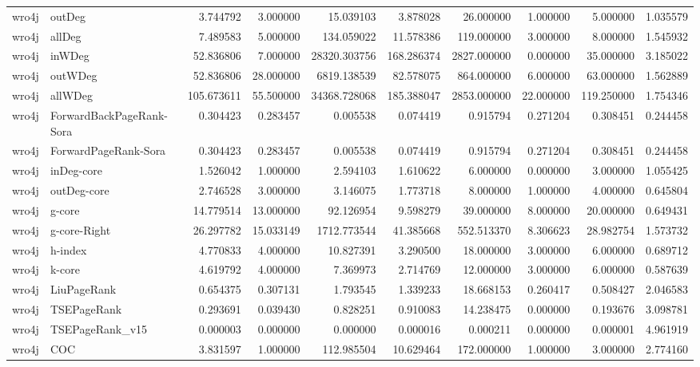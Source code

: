 \begin{tabular}{llrrrrrrrr}
wro4j & outDeg & 3.744792 & 3.000000 & 15.039103 & 3.878028 & 26.000000 & 1.000000 & 5.000000 & 1.035579 \\
wro4j & allDeg & 7.489583 & 5.000000 & 134.059022 & 11.578386 & 119.000000 & 3.000000 & 8.000000 & 1.545932 \\
wro4j & inWDeg & 52.836806 & 7.000000 & 28320.303756 & 168.286374 & 2827.000000 & 0.000000 & 35.000000 & 3.185022 \\
wro4j & outWDeg & 52.836806 & 28.000000 & 6819.138539 & 82.578075 & 864.000000 & 6.000000 & 63.000000 & 1.562889 \\
wro4j & allWDeg & 105.673611 & 55.500000 & 34368.728068 & 185.388047 & 2853.000000 & 22.000000 & 119.250000 & 1.754346 \\
wro4j & ForwardBackPageRank-Sora & 0.304423 & 0.283457 & 0.005538 & 0.074419 & 0.915794 & 0.271204 & 0.308451 & 0.244458 \\
wro4j & ForwardPageRank-Sora & 0.304423 & 0.283457 & 0.005538 & 0.074419 & 0.915794 & 0.271204 & 0.308451 & 0.244458 \\
wro4j & inDeg-core & 1.526042 & 1.000000 & 2.594103 & 1.610622 & 6.000000 & 0.000000 & 3.000000 & 1.055425 \\
wro4j & outDeg-core & 2.746528 & 3.000000 & 3.146075 & 1.773718 & 8.000000 & 1.000000 & 4.000000 & 0.645804 \\
wro4j & g-core & 14.779514 & 13.000000 & 92.126954 & 9.598279 & 39.000000 & 8.000000 & 20.000000 & 0.649431 \\
wro4j & g-core-Right & 26.297782 & 15.033149 & 1712.773544 & 41.385668 & 552.513370 & 8.306623 & 28.982754 & 1.573732 \\
wro4j & h-index & 4.770833 & 4.000000 & 10.827391 & 3.290500 & 18.000000 & 3.000000 & 6.000000 & 0.689712 \\
wro4j & k-core & 4.619792 & 4.000000 & 7.369973 & 2.714769 & 12.000000 & 3.000000 & 6.000000 & 0.587639 \\
wro4j & LiuPageRank & 0.654375 & 0.307131 & 1.793545 & 1.339233 & 18.668153 & 0.260417 & 0.508427 & 2.046583 \\
wro4j & TSEPageRank & 0.293691 & 0.039430 & 0.828251 & 0.910083 & 14.238475 & 0.000000 & 0.193676 & 3.098781 \\
wro4j & TSEPageRank_v15 & 0.000003 & 0.000000 & 0.000000 & 0.000016 & 0.000211 & 0.000000 & 0.000001 & 4.961919 \\
wro4j & COC & 3.831597 & 1.000000 & 112.985504 & 10.629464 & 172.000000 & 1.000000 & 3.000000 & 2.774160 \\

\end{tabular}
